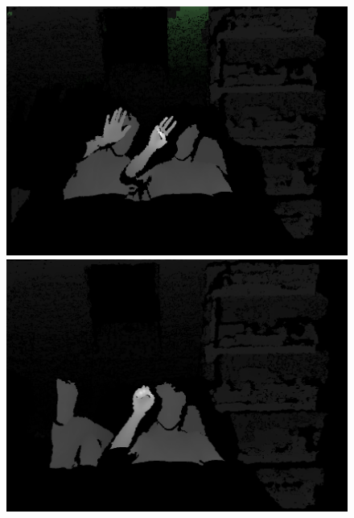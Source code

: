 \documentclass{article}
\begin{document}
\begin{figure}[!hb]
    \begin{minipage}[b]{0.49\textwidth}
    	   \centering
		\includegraphics[width=\textwidth]{IMG/KIN_02.png}
	\end{minipage}
    \hfill
    \begin{minipage}[b]{0.49\textwidth}
	    \centering
		\includegraphics[width=\textwidth]{IMG/KIN_03.png}
	\end{minipage}
\end{figure}
\end{document}

